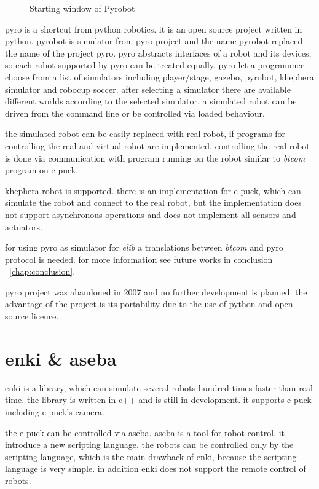 \begin{figure}
\begin{picture}
    \end{picture}%
  \fi
  \caption{\label{pic:pyrobot_win}%
   Starting window of Pyrobot}
  \end{figure}



  pyro is a shortcut from python robotics. it is an open source project written in python. pyrobot is simulator
  from pyro project and the name pyrobot replaced the name of the project pyro. 
  pyro abstracts interfaces of a robot and
  its devices, so each robot supported by pyro can be treated equally.
  pyro let a programmer choose from a list of simulators including player/stage, gazebo, pyrobot, khephera simulator
  and robocup soccer.
  after selecting a simulator there are available different worlds according to the selected simulator.
  a simulated robot can be driven from the command line or be controlled via loaded behaviour.
  
  the simulated robot can be easily replaced with real robot, if programs for controlling the real 
  and virtual robot are implemented. 	
  controlling the real robot is done via communication with program running on the robot similar 
  to {\it btcom} program on e-puck.
  
  khephera robot is supported. there is an implementation for e-puck, which can simulate the robot
  and connect to the real robot, but the implementation does not support asynchronous operations and does 
  not implement all sensors and actuators.
  
  for using pyro as simulator for {\it elib} a translations between {\it btcom} and pyro protocol is needed.
  for more information see future works in conclusion ~\ref{chap:conclusion}.	
  
  pyro project was abandoned in 2007 and no further development is planned.
  the advantage of the project is its portability due to the use of python and open source licence.
\section{enki \& aseba\cite{enki}}
  enki is a library, which can simulate several robots hundred times faster than real time.
  the library is written in c++ and is still in development. it supports e-puck including e-puck's camera. 
  
  the e-puck can be controlled via aseba. aseba is a tool for robot control.
  it introduce a new scripting language. 
  the robots can be controlled only by the scripting language, which is the main
  drawback of enki, because the scripting language is very simple.
  in addition enki does not support the remote control of robots.
